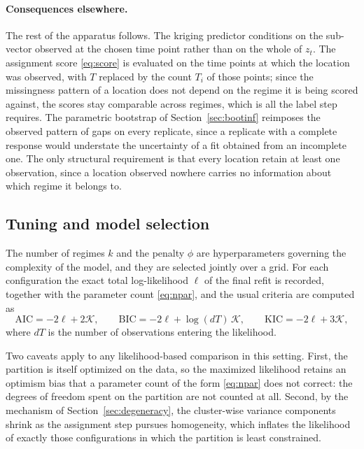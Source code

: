 \paragraph{Consequences elsewhere.} The rest of the apparatus follows. The kriging predictor conditions on the sub-vector observed at the chosen time point rather than on the whole of $z_t$. The assignment score \eqref{eq:score} is evaluated on the time points at which the location was observed, with $T$ replaced by the count $T_i$ of those points; since the missingness pattern of a location does not depend on the regime it is being scored against, the scores stay comparable across regimes, which is all the label step requires. The parametric bootstrap of Section~\ref{sec:bootinf} reimposes the observed pattern of gaps on every replicate, since a replicate with a complete response would understate the uncertainty of a fit obtained from an incomplete one. The only structural requirement is that every location retain at least one observation, since a location observed nowhere carries no information about which regime it belongs to.

\subsection{Tuning and model selection}\label{sec:tuning}

The number of regimes $k$ and the penalty $\phi$ are hyperparameters governing the complexity of the model, and they are selected jointly over a grid. For each configuration the exact total log-likelihood $\ell$ of the final refit is recorded, together with the parameter count \eqref{eq:npar}, and the usual criteria are computed as
\begin{equation}\label{eq:ic}
  \mathrm{AIC} = -2\ell + 2\mathcal{K}, \qquad
  \mathrm{BIC} = -2\ell + \log(dT)\,\mathcal{K}, \qquad
  \mathrm{KIC} = -2\ell + 3\mathcal{K},
\end{equation}
where $dT$ is the number of observations entering the likelihood.

Two caveats apply to any likelihood-based comparison in this setting. First, the partition is itself optimized on the data, so the maximized likelihood retains an optimism bias that a parameter count of the form \eqref{eq:npar} does not correct: the degrees of freedom spent on the partition are not counted at all. Second, by the mechanism of Section~\ref{sec:degeneracy}, the cluster-wise variance components shrink as the assignment step pursues homogeneity, which inflates the likelihood of exactly those configurations in which the partition is least constrained.

